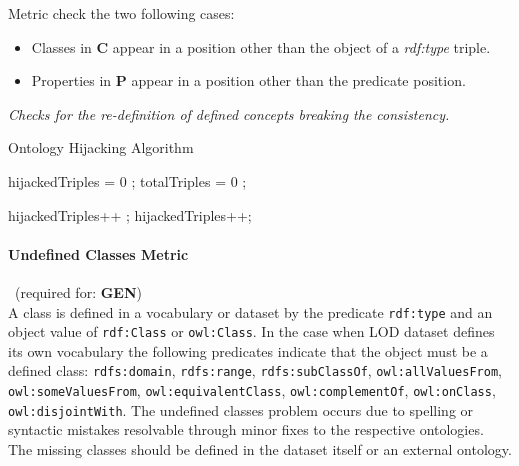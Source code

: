 Metric check the two following cases:
\begin{itemize}
\item Classes in \textbf{C} appear in a position other than the object of a \textit{rdf:type} triple. 
\item Properties in \textbf{P} appear in a position other than the predicate position.
\end{itemize}

\begin{mdframed}[style=metricdefinition]
\emph{Checks for the re-definition of defined concepts breaking the consistency.}
\end{mdframed}

\begin{algorithm}
\caption{Ontology Hijacking Algorithm}\label{lst:undefCl}
\begin{algorithmic}[1]
\State hijackedTriples = 0 ;
\State totalTriples = 0 ;
\EndProcedure

 hijackedTriples++ ;\EndIf
{} hijackedTriples++; \EndIf
\EndProcedure
\end{algorithmic}
\end{algorithm}

\paragraph{Undefined Classes Metric}~(required for: \textbf{GEN})~\\ 
A class is defined in a vocabulary or dataset by the predicate \texttt{rdf:type} and an object value of \texttt{rdf:Class} or \texttt{owl:Class}.
In the case when LOD dataset defines its own vocabulary the following predicates indicate that the object must be a defined class:  \texttt{rdfs:domain}, \texttt{rdfs:range}, \texttt{rdfs:subClassOf}, \texttt{owl:allValuesFrom}, \texttt{owl:someValuesFrom}, \texttt{owl:equivalentClass}, \texttt{owl:complementOf}, \texttt{owl:onClass}, \texttt{owl:disjointWith}.
The undefined classes problem occurs due to spelling or syntactic mistakes resolvable through minor fixes to the respective ontologies.
The missing classes should be defined in the dataset itself or an external ontology.

